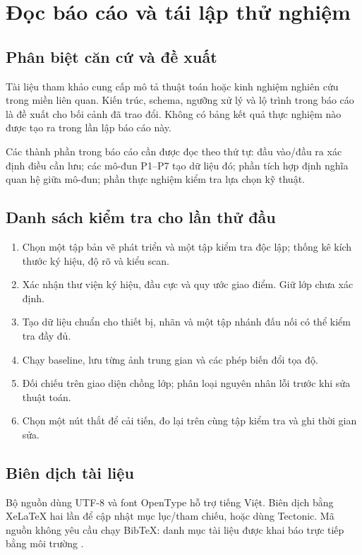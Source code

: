 \documentclass[11pt,a4paper]{article}
\newcommand{\code}[1]{\texttt{\detokenize{#1}}}
\begin{document}
\clearpage
\section{Đọc báo cáo và tái lập thử nghiệm}
\subsection{Phân biệt căn cứ và đề xuất}
Tài liệu tham khảo cung cấp mô tả thuật toán hoặc kinh nghiệm nghiên cứu trong miền liên quan. Kiến trúc, schema, ngưỡng xử lý và lộ trình trong báo cáo là đề xuất cho bối cảnh đã trao đổi. Không có bảng kết quả thực nghiệm nào được tạo ra trong lần lập báo cáo này.

Các thành phần trong báo cáo cần được đọc theo thứ tự: đầu vào/đầu ra xác định điều cần lưu; các mô-đun P1--P7 tạo dữ liệu đó; phần tích hợp định nghĩa quan hệ giữa mô-đun; phần thực nghiệm kiểm tra lựa chọn kỹ thuật.

\subsection{Danh sách kiểm tra cho lần thử đầu}
\begin{enumerate}
\item Chọn một tập bản vẽ phát triển và một tập kiểm tra độc lập; thống kê kích thước ký hiệu, độ rõ và kiểu scan.
\item Xác nhận thư viện ký hiệu, đầu cực và quy ước giao điểm. Giữ lớp chưa xác định.
\item Tạo dữ liệu chuẩn cho thiết bị, nhãn và một tập nhánh đấu nối có thể kiểm tra đầy đủ.
\item Chạy baseline, lưu từng ảnh trung gian và các phép biến đổi tọa độ.
\item Đối chiếu trên giao diện chồng lớp; phân loại nguyên nhân lỗi trước khi sửa thuật toán.
\item Chọn một nút thắt để cải tiến, đo lại trên cùng tập kiểm tra và ghi thời gian sửa.
\end{enumerate}

\subsection{Biên dịch tài liệu}
Bộ nguồn dùng UTF-8 và font OpenType hỗ trợ tiếng Việt. Biên dịch bằng XeLaTeX hai lần để cập nhật mục lục/tham chiếu, hoặc dùng Tectonic. Mã nguồn không yêu cầu chạy BibTeX: danh mục tài liệu được khai báo trực tiếp bằng môi trường \code{thebibliography}.
\end{document}
